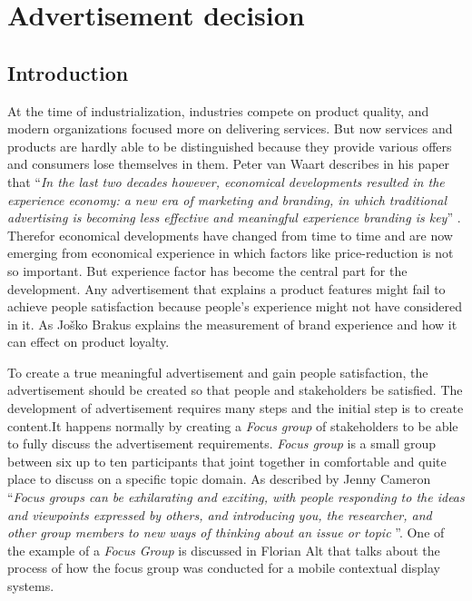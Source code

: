 \chapter{Advertisement decision} %

\label{Chapter4} %
\newpage



\section{Introduction}
At the time of industrialization, industries compete on product quality, and modern organizations focused more on delivering services. But now services and products are hardly able to be distinguished because they provide various offers and consumers lose themselves in them. Peter van Waart describes in his paper that ``\emph{In the last two decades however, economical developments resulted in the experience economy: a new era of marketing and branding, in which traditional advertising is becoming less effective and meaningful experience branding is key}'' \cite{Meaningful_ad}.  Therefor economical developments have changed from time to time and are now emerging from economical experience in which factors like price-reduction is not so important. But experience factor has become the central part for the development. Any advertisement that explains a product features might fail to achieve people satisfaction because people’s experience might not have considered in it. As Joško Brakus \cite{Brand_experience} explains the measurement of brand experience and how it can effect on product loyalty.

To create a true meaningful advertisement and gain people satisfaction, the advertisement should be created so that people and stakeholders be satisfied.
The development of advertisement requires many steps and the initial step is to create content.It happens normally by creating a \emph{Focus group} of stakeholders to be able to fully discuss the advertisement requirements. \emph{Focus group} is a small group between six up to ten participants that joint together in comfortable and quite place to discuss on a specific topic domain. As described by Jenny Cameron ``\emph{Focus groups can be exhilarating and exciting, with people responding to the ideas and viewpoints expressed by others, and introducing you, the researcher, and other group members to new ways of thinking about an issue or topic }''\cite{FocusGroup}. One of the example of a \emph{Focus Group} is discussed in Florian Alt \cite{mobile_focus_group} that talks about the process of how the focus group was conducted for a mobile contextual display systems.

